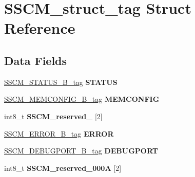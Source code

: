 \hypertarget{structSSCM__struct__tag}{}\section{S\+S\+C\+M\+\_\+struct\+\_\+tag Struct Reference}
\label{structSSCM__struct__tag}
\subsection*{Data Fields}
\begin{DoxyCompactItemize}
\item 
\mbox{\label{structSSCM__struct__tag_a0c6e4bd7c06914795c6bcf31d7aac924}} 
\mbox{\hyperlink{unionSSCM__STATUS__16B__tag}{S\+S\+C\+M\+\_\+\+S\+T\+A\+T\+U\+S\+\_\+B\+\_\+tag}} {\bfseries S\+T\+A\+T\+US}
\item 
\mbox{\label{structSSCM__struct__tag_ac6576d13bf2a43216cecd4f5b2957327}} 
\mbox{\hyperlink{unionSSCM__MEMCONFIG__16B__tag}{S\+S\+C\+M\+\_\+\+M\+E\+M\+C\+O\+N\+F\+I\+G\+\_\+B\+\_\+tag}} {\bfseries M\+E\+M\+C\+O\+N\+F\+IG}
\item 
\mbox{\label{structSSCM__struct__tag_a58289fca0cfdf2f919a4b39cb1f6bf8d}} 
int8\+\_\+t {\bfseries S\+S\+C\+M\+\_\+reserved\+\_} \mbox{[}2\mbox{]}
\item 
\mbox{\label{structSSCM__struct__tag_a7143c14aca21694dc2471170b60fefc6}} 
\mbox{\hyperlink{unionSSCM__ERROR__16B__tag}{S\+S\+C\+M\+\_\+\+E\+R\+R\+O\+R\+\_\+B\+\_\+tag}} {\bfseries E\+R\+R\+OR}
\item 
\mbox{\label{structSSCM__struct__tag_ac19c5895a643d2733a8a66d1f4c79e98}} 
\mbox{\hyperlink{unionSSCM__DEBUGPORT__16B__tag}{S\+S\+C\+M\+\_\+\+D\+E\+B\+U\+G\+P\+O\+R\+T\+\_\+B\+\_\+tag}} {\bfseries D\+E\+B\+U\+G\+P\+O\+RT}
\item 
\mbox{\label{structSSCM__struct__tag_a56f14647ed90123446b0cc2e5206e1db}} 
int8\+\_\+t {\bfseries S\+S\+C\+M\+\_\+reserved\+\_\+000A} \mbox{[}2\mbox{]}
\item 
\mbox{\label{structSSCM__struct__tag_afa7581847e75b58b7053fcdfac9b2423}} 

\end{DoxyCompactItemize}
